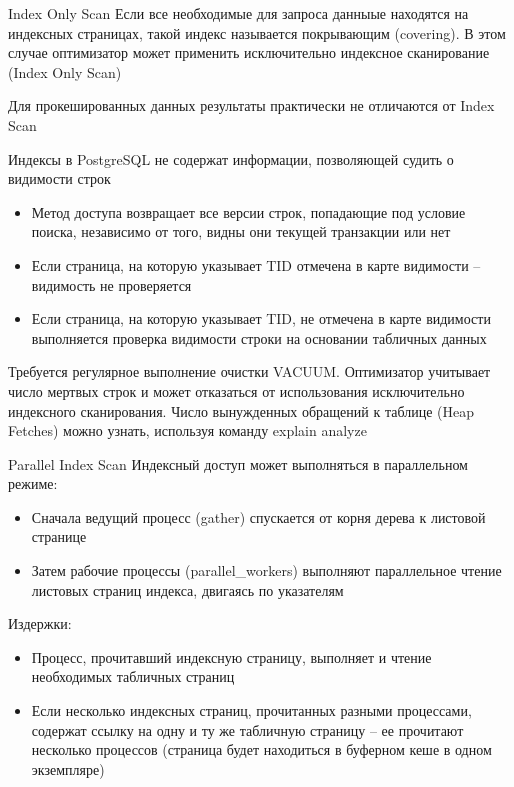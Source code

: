 \documentclass[12pt]{article}
\begin{document}
\begin{defin}{Index Only Scan}
    Если все необходимые для запроса данныые находятся на индексных страницах, такой индекс называется покрывающим (covering). В этом случае оптимизатор может применить исключительно индексное сканирование (Index Only Scan)

    Для прокешированных данных результаты практически не отличаются от Index Scan 

    Индексы в PostgreSQL не содержат информации, позволяющей судить о видимости строк 

    \begin{itemize}
        \item Метод доступа возвращает все версии строк, попадающие под условие поиска, независимо от того, видны они текущей транзакции или нет 
        \item Если страница, на которую указывает TID отмечена в карте видимости -- видимость не проверяется 
        \item Если страница, на которую указывает TID, не отмечена в карте видимости выполняется проверка видимости строки на основании табличных данных 
    \end{itemize}

    Требуется регулярное выполнение очистки VACUUM. Оптимизатор учитывает число мертвых строк и может отказаться от использования исключительно индексного сканирования. Число вынужденных обращений к таблице (Heap Fetches) можно узнать, используя команду explain analyze 
\end{defin}

\begin{defin}{Parallel Index Scan}
    Индексный доступ может выполняться в параллельном режиме:

    \begin{itemize}
        \item Сначала ведущий процесс (gather) спускается от корня дерева к листовой странице 
        \item Затем рабочие процессы (parallel\_workers) выполняют параллельное чтение листовых страниц индекса, двигаясь по указателям 
    \end{itemize}

    Издержки:

    \begin{itemize}
        \item Процесс, прочитавший индексную страницу, выполняет и чтение необходимых табличных страниц 
        \item Если несколько индексных страниц, прочитанных разными процессами, содержат ссылку на одну и ту же табличную страницу -- ее прочитают несколько процессов (страница будет находиться в буферном кеше в одном экземпляре)
    \end{itemize}
\end{defin}
\end{document}

